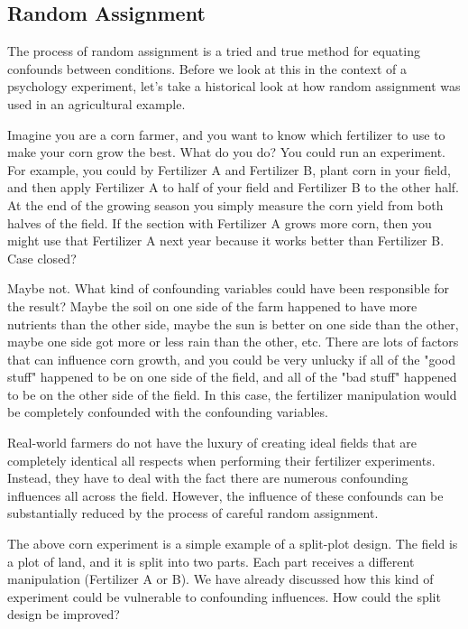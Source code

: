 \subsection{Random Assignment}

The process of random assignment is a tried and true method for equating confounds between conditions. Before we look at this in the context of a psychology experiment, let's take a historical look at how random assignment was used in an agricultural example.

Imagine you are a corn farmer, and you want to know which fertilizer to use to make your corn grow the best. What do you do? You could run an experiment. For example, you could by Fertilizer A and Fertilizer B, plant corn in your field, and then apply Fertilizer A to half of your field and Fertilizer B to the other half. At the end of the growing season you simply measure the corn yield from both halves of the field. If the section with Fertilizer A grows more corn, then you might use that Fertilizer A next year because it works better than Fertilizer B. Case closed?

Maybe not. What kind of confounding variables could have been responsible for the result? Maybe the soil on one side of the farm happened to have more nutrients than the other side, maybe the sun is better on one side than the other, maybe one side got more or less rain than the other, etc. There are lots of factors that can influence corn growth, and you could be very unlucky if all of the "good stuff" happened to be on one side of the field, and all of the "bad stuff" happened to be on the other side of the field. In this case, the fertilizer manipulation would be completely confounded with the confounding variables.

Real-world farmers do not have the luxury of creating ideal fields that are completely identical all respects when performing their fertilizer experiments. Instead, they have to deal with the fact there are numerous confounding influences all across the field. However, the influence of these confounds can be substantially reduced by the process of careful random assignment.

The above corn experiment is a simple example of a split-plot design. The field is a plot of land, and it is split into two parts. Each part receives a different manipulation (Fertilizer A or B). We have already discussed how this kind of experiment could be vulnerable to confounding influences. How could the split design be improved?

